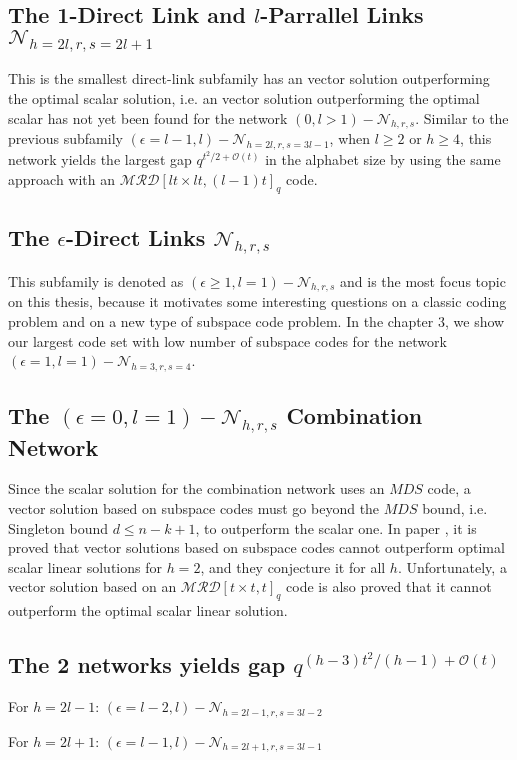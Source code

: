 \subsection{The 1-Direct Link and $l$-Parrallel Links $\mathcal{N}_{h=2l,r,s=2l+1}$}

This is the smallest direct-link subfamily has an vector solution
outperforming the optimal scalar solution, i.e. an vector solution
outperforming the optimal scalar has not yet been found for the network
$(0,l>1)-\mathcal{N}_{h,r,s}$. Similar to the previous subfamily
$\left(\epsilon=l-1,l\right)-\mathcal{N}_{h=2l,r,s=3l-1}$, when $l\geq2$
or $h\geq4$, this network yields the largest gap $q^{t^{2}/2+\mathcal{O}(t)}$
in the alphabet size by using the same approach with an $\mathcal{MRD}\left[lt\times lt,(l-1)t\right]_{q}$
code. 

\subsection{The $\epsilon$-Direct Links $\mathcal{N}_{h,r,s}$}

This subfamily is denoted as $\left(\epsilon\geq1,l=1\right)-\mathcal{N}_{h,r,s}$
and is the most focus topic on this thesis, because it motivates some
interesting questions on a classic coding problem and on a new type
of subspace code problem. In the chapter 3, we show our largest code
set with low number of subspace codes for the network $\left(\epsilon=1,l=1\right)-\mathcal{N}_{h=3,r,s=4}$.

\subsection{The $\left(\epsilon=0,l=1\right)-\mathcal{N}_{h,r,s}$ Combination
Network}

Since the scalar solution for the combination network uses an $MDS$
code, a vector solution based on subspace codes must go beyond the
$MDS$ bound, i.e. Singleton bound $d\leq n-k+1$, to outperform the
scalar one. In paper \cite{Wachter-Zeh:2018}, it is proved that vector
solutions based on subspace codes cannot outperform optimal scalar
linear solutions for $h=2$, and they conjecture it for all $h$.
Unfortunately, a vector solution based on an $\mathcal{MRD}\left[t\times t,t\right]_{q}$
code is also proved that it cannot outperform the optimal scalar linear
solution.

\subsection{The 2 networks yields gap $q^{(h-3)t^{2}/(h-1)+\mathcal{O}(t)}$}

For $h=2l-1$: $\left(\epsilon=l-2,l\right)-\mathcal{N}_{h=2l-1,r,s=3l-2}$

For $h=2l+1$: $\left(\epsilon=l-1,l\right)-\mathcal{N}_{h=2l+1,r,s=3l-1}$

\clearpage